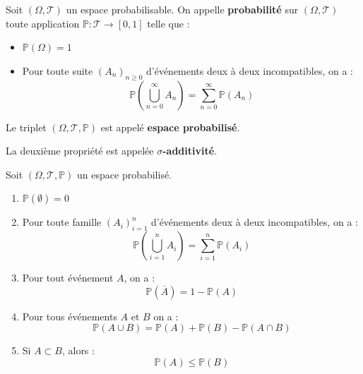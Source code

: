 \documentclass[a4paper,12pt]{article}
\begin{document}
\begin{definition}
    Soit $(\Omega, \mathcal{T})$ un espace probabilisable.
    On appelle \textbf{probabilité} sur $(\Omega, \mathcal{T})$ toute application $\mathbb{P} : \mathcal{T} \to [0, 1]$ telle que :
    \begin{itemize}[label=--]
        \item $\mathbb{P}(\Omega) = 1$
        \item Pour toute suite $(A_n)_{n \geq 0}$ d'événements deux à deux incompatibles, on a :
        $$
        \mathbb{P}\left(\bigcup\limits_{n = 0}^\infty A_n\right) = \sum\limits_{n = 0}^\infty \mathbb{P}(A_n)
        $$
    \end{itemize}
    Le triplet $(\Omega, \mathcal{T}, \mathbb{P})$ est appelé \textbf{espace probabilisé}.
\end{definition}

\begin{remarque}
    La deuxième propriété est appelée \textbf{$\sigma$-additivité}.
\end{remarque}

\begin{proposition}{}{}
    Soit $(\Omega, \mathcal{T}, \mathbb{P})$ un espace probabilisé.
    \begin{enumerate}[label=(\roman*)]
        \item $\mathbb{P}(\emptyset) = 0$
        \item Pour toute famille $(A_i)_{i = 1}^n$ d'événements deux à deux incompatibles, on a :
        $$
        \mathbb{P}\left(\bigcup\limits_{i = 1}^n A_i\right) = \sum\limits_{i = 1}^n \mathbb{P}(A_i)
        $$
        \item Pour tout événement $A$, on a :
        $$
        \mathbb{P}(\overline{A}) = 1 - \mathbb{P}(A)
        $$
        \item Pour tous événements $A$ et $B$ on a :
        $$
        \mathbb{P}(A \cup B) = \mathbb{P}(A) + \mathbb{P}(B) - \mathbb{P}(A \cap B)
        $$
        \item Si $A \subset B$, alors :
        $$
        \mathbb{P}(A) \leq \mathbb{P}(B)
        $$
    \end{enumerate}
\end{proposition}
\end{document}
